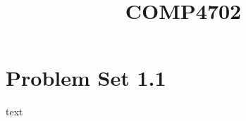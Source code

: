 \documentclass{problemset}
\title{COMP4702}
\begin{document}
\maketitle
\section{Problem Set 1.1}
\lipsum[1]
text
%
\end{document}

